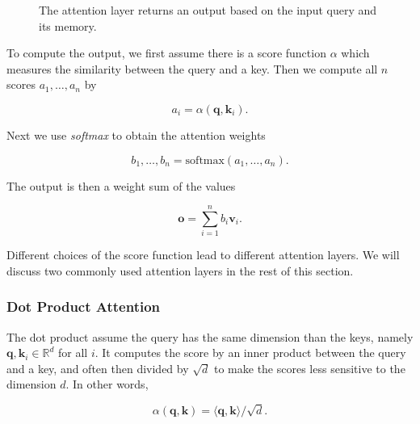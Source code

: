 \begin{figure}[hpt]
	\centering
	
	\caption{The attention layer returns an output based on the input query and its memory.}
	\label{fig:attention}
\end{figure}

To compute the output, we first assume there is a score function $\alpha$ which measures the similarity between the query and a key. Then we compute all $n$ scores $a_1, \ldots, a_n$ by

$$a_i = \alpha(\mathbf q, \mathbf k_i).$$

Next we use \textit{softmax} to obtain the attention weights

$$b_1, \ldots, b_n = \textrm{softmax}(a_1, \ldots, a_n).$$

The output is then a weight sum of the values

$$\mathbf o = \sum_{i=1}^n b_i \mathbf v_i.$$

Different choices of the score function lead to different attention layers. We will discuss two commonly used attention layers in the rest of this section. 


\subsubsection{Dot Product Attention}

The dot product assume the query has the same dimension than the keys, namely $\mathbf q, \mathbf k_i \in\mathbb R^d$ for all $i$. It computes the score by an inner product between the query and a key, and often then divided by $\sqrt{d}$ to make the scores less sensitive to the dimension $d$. In other words,

$$\alpha(\mathbf q, \mathbf k) = \langle \mathbf q, \mathbf k \rangle /\sqrt{d}.$$

